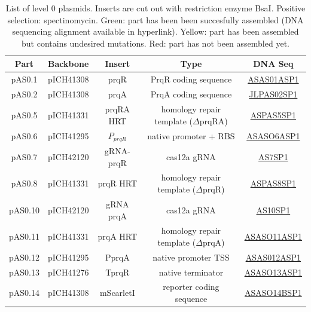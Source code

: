 \begin{table}[H]
\centering
\begin{tabular}{|c|c|c|c|c|}
\hline
\textbf{Part} & \textbf{Backbone} & \textbf{Insert} & \textbf{Type} & \textbf{DNA Seq} \\ \hline
pAS0.1 & pICH41308 & prqR & PrqR coding sequence & \cellcolor[HTML]{FFFE65} \href{https://scaralbi.github.io/assets/dna/L0/2020-11-13_D01_ASAS01ASP1-alignment.pdf}{ASAS01ASP1} \\ \hline
pAS0.2 & pICH41308 & prqA & PrqA coding sequence & \cellcolor[HTML]{32CB00} \href{https://scaralbi.github.io/assets/dna/L0/2020-10-29_E10_JLPAS02SP1-alignment.pdf}{JLPAS02SP1} \\ \hline
pAS0.5 & pICH41331 & prqRA HRT & homology repair template ($\Delta$prqRA) & \cellcolor[HTML]{32CB00} \href{https://scaralbi.github.io/assets/dna/L0/2020-10-29_E10_JLPAS02SP1-alignment.pdf}{ASPAS5SP1} \\ \hline
pAS0.6 & pICH41295 & $P_{prqR}$ & native promoter + RBS & \cellcolor[HTML]{32CB00} \href{https://scaralbi.github.io/assets/dna/L0/2020-11-03_G01_ASASO6ASP1-alignment.pdf}{ASASO6ASP1} \\ \hline
pAS0.7 & pICH42120 & gRNA-prqR & cas12a gRNA & \cellcolor[HTML]{32CB00} \href{https://scaralbi.github.io/assets/dna/L0/2020-07-28_H07_AS7SP1-alignment.pdf}{AS7SP1} \\ \hline
pAS0.8 & pICH41331 & prqR HRT & homology repair template ($\Delta$prqR)  & \cellcolor[HTML]{32CB00} \href{https://scaralbi.github.io/assets/dna/L0/2020-07-30_E11_ASPAS8SP1-2020-07-30_E11_ASPAS8SP1ab1-alignment.pdf}{ASPAS8SP1} \\ \hline
pAS0.10 & pICH42120 & gRNA prqA & cas12a gRNA & \cellcolor[HTML]{32CB00} \href{https://scaralbi.github.io/assets/dna/L0/2020-09-07_B02_ASAS010SP1-alignment.pdf}{AS10SP1} \\ \hline
pAS0.11 & pICH41331 & prqA HRT & homology repair template ($\Delta$prqA)  & \cellcolor[HTML]{32CB00} \href{https://scaralbi.github.io/assets/dna/L0/2020-11-03_A02_ASASO11ASP1-alignment.pdf}{ASASO11ASP1} \\ \hline
pAS0.12 & pICH41295 & PprqA & native promoter TSS & \cellcolor[HTML]{32CB00} \href{https://scaralbi.github.io/assets/dna/L0/2020-11-13_H01_ASAS012ASP1-alignment.pdf}{ASAS012ASP1} \\ \hline
pAS0.13 & pICH41276 & TprqR & native terminator & \cellcolor[HTML]{32CB00} \href{https://scaralbi.github.io/assets/dna/L0/2020-11-03_E01_ASASO13ASP1-alignment.pdf}{ASASO13ASP1} \\ \hline
pAS0.14 & pICH41308 & mScarletI & reporter coding sequence & \cellcolor[HTML]{32CB00} \href{https://scaralbi.github.io/assets/dna/L0/2020-11-16_G09_ASASO14BSP1-alignment.pdf}{ASASO14BSP1} \\ \hline
\end{tabular}
\caption{List of level 0 plasmids. Inserts are cut out with restriction enzyme BsaI. Positive selection: spectinomycin. Green: part has been been succesfully assembled (DNA sequencing alignment available in hyperlink). Yellow: part has been assembled but contains undesired mutations. Red: part has not been assembled yet.}
\label{table:level0}
\end{table}

